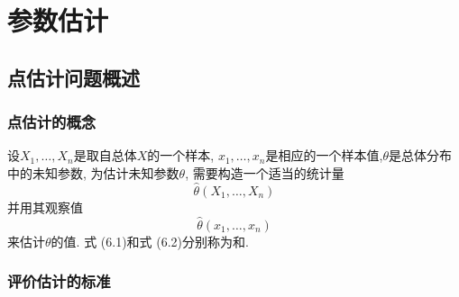 \chapter{参数估计}
\section{点估计问题概述}
\subsection{点估计的概念}
设$X_1,\ldots,X_n$是取自总体$X$的一个样本, $x_1,\ldots,x_n$是相应的一个样本值,$\theta$是总体分布中的未知参数, 为估计未知参数$\theta$, 需要构造一个适当的统计量
\begin{equation}
    \hat{\theta}(X_1,\ldots,X_n)
\end{equation}
并用其观察值
\begin{equation}
    \hat{\theta}(x_1,\ldots,x_n)
\end{equation}
来估计$\theta$的值. 式 (6.1)和式 (6.2)分别称为和.
\subsection{评价估计的标准}
